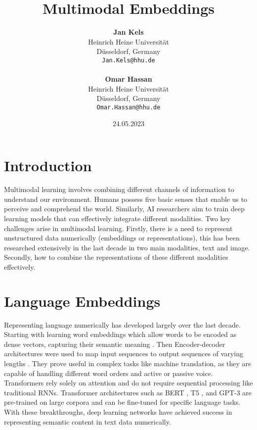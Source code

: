 \documentclass[11pt,a4paper]{article}
\title{Multimodal Embeddings}
\author{
  \textbf{Jan Kels} \\
  Heinrich Heine Universität \\
  Düsseldorf, Germany \\
  \texttt{Jan.Kels@hhu.de} \\ \\\And
  \textbf{Omar Hassan}\\
  Heinrich Heine Universität \\
  Düsseldorf, Germany \\
  \texttt{Omar.Hassan@hhu.de}
  }
\date{24.05.2023}
\begin{document}
\maketitle


\section{Introduction} %
Multimodal learning involves combining different channels of information to understand our environment. Humans possess five basic senses that enable us to perceive and comprehend the world. Similarly, AI researchers aim to train deep learning models that can effectively integrate different modalities. Two key challenges arise in multimodal learning. Firstly, there is a need to represent unstructured data numerically (embeddings or representations), this has been researched extensively in the last decade in two main modalities, text and image. Secondly, how to combine the representations of these different modalities effectively. \cite{akkus2023multimodal}

\section{Language Embeddings}
Representing language numerically has developed largely over the last decade. Starting with learning word embeddings which allow words to be encoded as dense vectors, capturing their semantic meaning \cite{mikolov2013efficient}. Then Encoder-decoder architectures were used to map input sequences to output sequences of varying lengths \cite{bahdanau2016neural}. They prove useful in complex tasks like machine translation, as they are capable of handling different word orders and active or passive voice.
Transformers \cite{vaswani2017attention} rely solely on attention and do not require sequential processing like traditional RNNs. Transformer architectures such as BERT \cite{devlin2019bert}, T5 \cite{raffel2020exploring}, and GPT-3 \cite{brown2020language} are pre-trained on large corpora and can be fine-tuned for specific language tasks. With these breakthroughs, deep learning networks have achieved success in representing semantic content in text data numerically.
\end{document}
